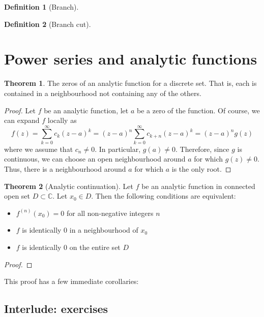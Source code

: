 \documentclass[aps,pra,showpacs,notitlepage,onecolumn,superscriptaddress,nofootinbib]{revtex4-1}
\theoremstyle{definition}
\newtheorem{definition}{Definition}[section]
\newtheorem{theorem}{Theorem}[section]
\begin{document}
\begin{definition}[Branch]
\end{definition}

\begin{definition}[Branch cut]
  \end{definition}

\section{Power series and analytic functions}

\begin{theorem}
  The zeros of an analytic function for a discrete set. That is, each is contained in a neighbourhood not containing any
  of the others.
\end{theorem}

\begin{proof}
  Let $f$ be an analytic function, let $a$ be a zero of the function. Of course, we can expand $f$ locally as
  $$f(z) = \sum_{k = 0}^{\infty} c_k (z - a)^{k} = (z - a)^{n} \sum_{k = 0}^{\infty} c_{k + n} (z - a)^{k} = (z - a)^{n} g(z)$$
  where we assume that $c_n \neq 0$. In particular, $g(a) \neq 0$. Therefore, since $g$ is continuous, we can choose an open neighbourhood
  around $a$ for which $g(z) \neq 0$. Thus, there is a neighbourhood around $a$ for which $a$ is the only root.
\end{proof}

\begin{theorem}[Analytic continuation]
  Let $f$ be an analytic function in connected open set $D \subset \mathbb{C}$. Let $x_0 \in D$. Then the following conditions are equivalent:
  \begin{itemize}
  \item $f^{(n)}(x_0) = 0$ for all non-negative integers $n$
  \item $f$ is identically $0$ in a neighbourhood of $x_0$
    \item $f$ is identically $0$ on the entire set $D$
    \end{itemize}
\end{theorem}
\begin{proof}

\end{proof}

\noindent This proof has a few immediate corollaries:



\subsection{Interlude: exercises}
\end{document}

